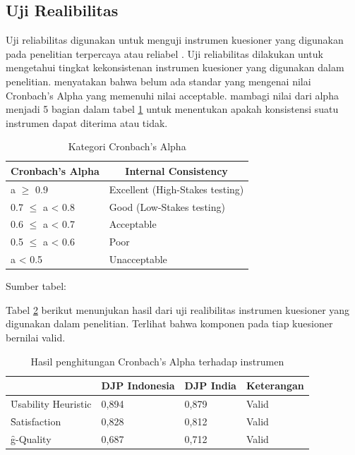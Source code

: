 \subsection{Uji Realibilitas}
Uji reliabilitas digunakan untuk menguji instrumen kuesioner yang digunakan pada penelitian terpercaya atau reliabel \citep{article.raharjo}. Uji reliabilitas dilakukan untuk mengetahui tingkat kekonsistenan instrumen kuesioner yang digunakan dalam penelitian. \citet{buku.george} menyatakan bahwa belum ada standar yang mengenai nilai Cronbach's Alpha yang memenuhi nilai acceptable. \citet{buku.george} mambagi nilai dari alpha menjadi 5 bagian dalam tabel \ref{tab:cronalpha} untuk menentukan apakah konsistensi suatu instrumen dapat diterima atau tidak.
\begin{table}
	\centering
	\caption{Kategori Cronbach's Alpha}
	\label{tab:cronalpha}
	\begin{tabular}{|l|l|}
		\hline
		\multicolumn{1}{|c|}{\bf Cronbach's Alpha} & \multicolumn{1}{c|}{{\bf Internal Consistency}} \\ \hline
		a $\geq$ 0.9 & Excellent (High-Stakes testing) \\ \hline
		0.7 $\leq$ a < 0.8 & Good (Low-Stakes testing) \\ \hline
		0.6 $\leq$ a < 0.7 & Acceptable  \\ \hline
		0.5 $\leq$ a < 0.6 & Poor   \\ \hline
		a < 0.5           & Unacceptable  \\ \hline 
	\end{tabular}
		\begin{center}
			{\small Sumber tabel: \citep{buku.george}}
		\end{center}
\end{table}
Tabel \ref{tab:hasilconalp} berikut menunjukan hasil dari uji realibilitas instrumen kuesioner yang digunakan dalam penelitian. Terlihat bahwa komponen pada tiap kuesioner bernilai valid.
\begin{table}
	\centering
	\caption{Hasil penghitungan Cronbach's Alpha terhadap instrumen}
	\label{tab:hasilconalp}
	\begin{tabular}{|l|l|l|l|}
		\cline{2-4}
		\multicolumn{1}{c|}{} &
		\multicolumn{1}{l|}{\bf DJP Indonesia} &
		\multicolumn{1}{l|}{\bf DJP India} &
		\multicolumn{1}{l|}{{\bf Keterangan}} \\ \hline
		\f{Usability Heuristic} & 0,894
		 & 0,879 & Valid \\ \hline
		\f{Satisfaction} & 0,828
		& 0,812 & Valid \\ \hline
		\f{g-Quality} & 0,687
		 & 0,712 & Valid \\ \hline
	\end{tabular}
\end{table}
